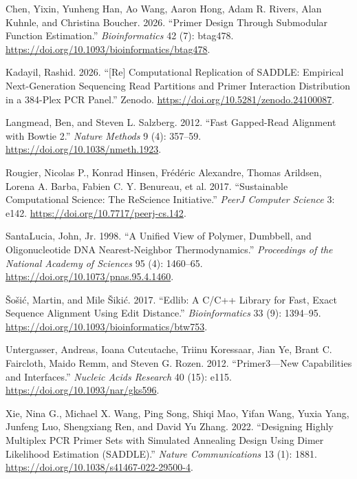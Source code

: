 \documentclass[
]{article}
\newlength{\cslhangindent}
\newenvironment{CSLReferences}[2] %
 {\begin{list}{}{%
  \setlength{\itemindent}{0pt}
  \setlength{\leftmargin}{0pt}
  \setlength{\parsep}{0pt}
  \ifodd #1
   \setlength{\leftmargin}{\cslhangindent}
   \setlength{\itemindent}{-1\cslhangindent}
  \fi
  \setlength{\itemsep}{#2\baselineskip}}}
 {\end{list}}
\begin{document}
\label{refs}
\begin{CSLReferences}{1}{0}
Chen, Yixin, Yunheng Han, Ao Wang, Aaron Hong, Adam R. Rivers, Alan
Kuhnle, and Christina Boucher. 2026. {``Primer Design Through Submodular
Function Estimation.''} \emph{Bioinformatics} 42 (7): btag478.
\url{https://doi.org/10.1093/bioinformatics/btag478}.

Kadayil, Rashid. 2026. {``{{[}Re{]}} Computational Replication of
{SADDLE}: Empirical Next-Generation Sequencing Read Partitions and
Primer Interaction Distribution in a 384-Plex {PCR} Panel.''} Zenodo.
\url{https://doi.org/10.5281/zenodo.24100087}.

Langmead, Ben, and Steven L. Salzberg. 2012. {``Fast Gapped-Read
Alignment with {Bowtie} 2.''} \emph{Nature Methods} 9 (4): 357--59.
\url{https://doi.org/10.1038/nmeth.1923}.

Rougier, Nicolas P., Konrad Hinsen, Frédéric Alexandre, Thomas Arildsen,
Lorena A. Barba, Fabien C. Y. Benureau, et al. 2017. {``Sustainable
Computational Science: The {ReScience} Initiative.''} \emph{PeerJ
Computer Science} 3: e142. \url{https://doi.org/10.7717/peerj-cs.142}.

SantaLucia, John, Jr. 1998. {``A Unified View of Polymer, Dumbbell, and
Oligonucleotide {DNA} Nearest-Neighbor Thermodynamics.''}
\emph{Proceedings of the National Academy of Sciences} 95 (4): 1460--65.
\url{https://doi.org/10.1073/pnas.95.4.1460}.

Šošić, Martin, and Mile Šikić. 2017. {``Edlib: A {C}/{C}++ Library for
Fast, Exact Sequence Alignment Using Edit Distance.''}
\emph{Bioinformatics} 33 (9): 1394--95.
\url{https://doi.org/10.1093/bioinformatics/btw753}.

Untergasser, Andreas, Ioana Cutcutache, Triinu Koressaar, Jian Ye, Brant
C. Faircloth, Maido Remm, and Steven G. Rozen. 2012. {``{Primer3}---New
Capabilities and Interfaces.''} \emph{Nucleic Acids Research} 40 (15):
e115. \url{https://doi.org/10.1093/nar/gks596}.

Xie, Nina G., Michael X. Wang, Ping Song, Shiqi Mao, Yifan Wang, Yuxia
Yang, Junfeng Luo, Shengxiang Ren, and David Yu Zhang. 2022.
{``Designing Highly Multiplex {PCR} Primer Sets with {Simulated}
{Annealing} {Design} Using {Dimer} {Likelihood} {Estimation}
({SADDLE}).''} \emph{Nature Communications} 13 (1): 1881.
\url{https://doi.org/10.1038/s41467-022-29500-4}.

\end{CSLReferences}
\end{document}
